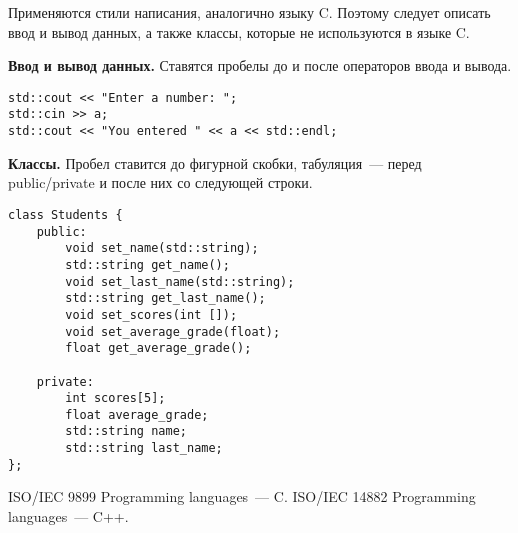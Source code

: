 \documentclass{article}
\begin{document}
Применяются стили написания, аналогично языку C. Поэтому следует описать ввод и вывод данных, а также классы, которые не используются в языке C.\par
\textbf{Ввод и вывод данных.} Ставятся пробелы до и после операторов ввода и вывода.
\begin{lstlisting}[caption=Ввод и вывод данных.]
std::cout << "Enter a number: ";
std::cin >> a;
std::cout << "You entered " << a << std::endl;
\end{lstlisting}

\textbf{Классы.} Пробел ставится до фигурной скобки, табуляция~--- перед public/private и после них со следующей строки.
\begin{lstlisting}[caption=Классы.]
class Students {
    public:
        void set_name(std::string);
        std::string get_name();
        void set_last_name(std::string);
        std::string get_last_name();
        void set_scores(int []);
        void set_average_grade(float);
        float get_average_grade();

    private:
        int scores[5];
        float average_grade;
        std::string name;
        std::string last_name;
};
\end{lstlisting}

\begin{thebibliography}{}
ISO/IEC 9899 Programming languages~--- C.
ISO/IEC 14882 Programming languages~--- C++.
\end{thebibliography}
\end{document}
